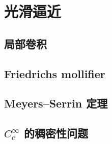 \section{光滑逼近}
\label{b1:sec:2201}


\subsection{局部卷积}
\label{b1:subsec:220101}

\subsection{Friedrichs mollifier}
\label{b1:subsec:220102}

\subsection{Meyers–Serrin 定理}
\label{b1:subsec:220103}

\subsection{\texorpdfstring{\(C_c^\infty\)}{Cc∞} 的稠密性问题}
\label{b1:subsec:220104}


